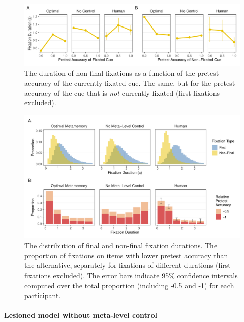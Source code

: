 \begin{figure}[t]
  \includegraphics[scale=.65]{figs/memory/exp2/nonfinal.pdf}
  \caption{
     The duration of non-final fixations as a function of the pretest accuracy of the currently fixated cue.
     The same, but for the pretest accuracy of the cue that is \emph{not} currently fixated (first fixations excluded).
  \label{fig:nonfinal}
}
\end{figure}

\begin{figure}[t]
  \includegraphics[scale=.65]{figs/memory/exp2/commitment.pdf}
  \caption{
     The distribution of final and non-final fixation durations.
     The proportion of fixations on items with lower pretest accuracy than the alternative, separately for fixations of different durations (first fixations excluded). The error bars indicate 95\% confidence intervals computed over the total proportion (including -0.5 and -1) for each participant.
  \label{fig:commitment}
}
\end{figure}

\paragraph{Lesioned model without meta-level control}

